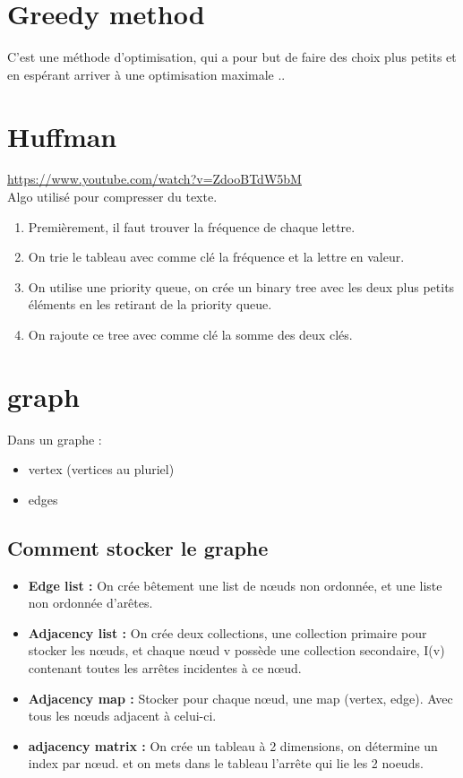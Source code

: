 \documentclass[a4paper]{article}
\begin{document}
\section{Greedy method}
C'est une méthode d'optimisation, qui a pour but de faire des choix plus petits et en espérant arriver à une optimisation maximale .. 

\section{Huffman}
\url{https://www.youtube.com/watch?v=ZdooBTdW5bM}\\
Algo utilisé pour compresser du texte.
\begin{enumerate}
\item Premièrement, il faut trouver la fréquence de chaque lettre.
\item On trie le tableau avec comme clé la fréquence et la lettre en valeur.
\item On utilise une priority queue, on crée un binary tree avec les deux plus petits éléments en les retirant de la priority queue.
\item On rajoute ce tree avec comme clé la somme des deux clés.
\end{enumerate}

\section{graph}
Dans un graphe :
\begin{itemize}
\item vertex (vertices au pluriel)
\item edges
\end{itemize}

\subsection{Comment stocker le graphe}

\begin{itemize}
\item \textbf{Edge list :}
 On crée bêtement une list de nœuds non ordonnée, et une liste non ordonnée d'arêtes.
\item \textbf{Adjacency list :}
 On crée deux collections, une collection primaire pour stocker les nœuds, et chaque nœud v possède une collection secondaire, I(v) contenant toutes les arrêtes incidentes à ce nœud.
\item \textbf{Adjacency map :}
 Stocker pour chaque nœud, une map (vertex, edge). Avec tous les nœuds adjacent à celui-ci.
\item \textbf{adjacency matrix :}
On crée un tableau à 2 dimensions, on détermine un index par nœud. et on mets dans le tableau l'arrête qui lie les 2 noeuds.
\end{itemize}
\end{document}

